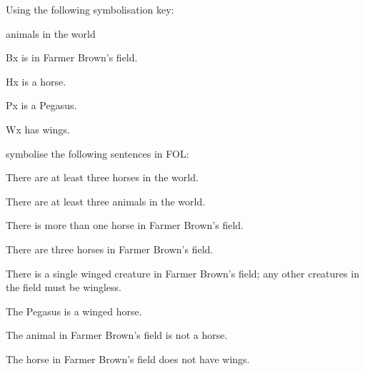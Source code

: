 \problempart Using the following symbolisation key:
\begin{ekey}
\item[\text{domain}] animals in the world
\item[Bx]  is in Farmer Brown's field.
\item[Hx]  is a horse.
\item[Px]  is a Pegasus.
\item[Wx]  has wings.
\end{ekey}
symbolise the following sentences in FOL:
\begin{earg}
\item There are at least three horses in the world.
\item[] 
\item There are at least three animals in the world.
\item[] 
\item There is more than one horse in Farmer Brown's field.
\item[] 
\item There are three horses in Farmer Brown's field.
\item[] 
\item There is a single winged creature in Farmer Brown's field; any other creatures in the field must be wingless.
\item[] 
\item The Pegasus is a winged horse.
\item[] 
\item The animal in Farmer Brown's field is not a horse.
\item[] 
\item The horse in Farmer Brown's field does not have wings.
\item[] 

\end{earg}

